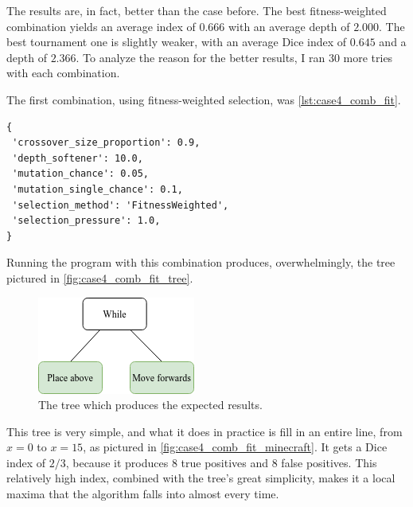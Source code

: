 \documentclass{report}
\newenvironment{code}{\captionsetup{type=listing}}{}
\begin{document}
The results are, in fact, better than the case before. The best fitness-weighted combination yields an average index of $0.666$ with an average depth of $2.000$. The best tournament one is slightly weaker, with an average Dice index of $0.645$ and a depth of $2.366$. To analyze the reason for the better results, I ran 30 more tries with each combination.

The first combination, using fitness-weighted selection, was \autoref{lst:case4_comb_fit}.

\begin{code}
    \begin{verbatim}
{
 'crossover_size_proportion': 0.9,
 'depth_softener': 10.0,
 'mutation_chance': 0.05,
 'mutation_single_chance': 0.1,
 'selection_method': 'FitnessWeighted',
 'selection_pressure': 1.0,
}
    \end{verbatim}
    \caption{A set of parameters that lead to an average index of $0.666$ and an average depth of $2.000$.}
    \label{lst:case4_comb_fit}
\end{code}

Running the program with this combination produces, overwhelmingly, the tree pictured in \autoref{fig:case4_comb_fit_tree}.

\begin{figure}[ht]
    \centering
    \includegraphics[scale=0.75]{case4_fit_tree}
    \caption{The tree which produces the expected results.}
    \label{fig:case4_comb_fit_tree}
\end{figure}

This tree is very simple, and what it does in practice is fill in an entire line, from $x = 0$ to $x = 15$, as pictured in \autoref{fig:case4_comb_fit_minecraft}. It gets a Dice index of $2/3$, because it produces $8$ true positives and $8$ false positives. This relatively high index, combined with the tree's great simplicity, makes it a local maxima that the algorithm falls into almost every time.
\end{document}
